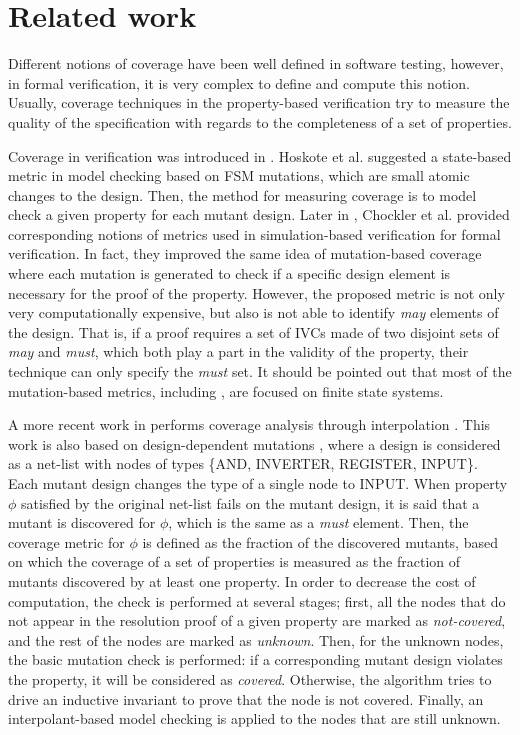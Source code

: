 \section{Related work}
\label{sec:related}

Different notions of coverage have been well defined in software testing, however, in formal verification, it is very complex to define and compute this notion.
Usually, coverage techniques in the property-based verification try to measure the quality of the specification with regards to the completeness of a set of properties.

Coverage in verification was introduced in \cite{hoskote1999coverage, katz1999have}. Hoskote et al. \cite{hoskote1999coverage} suggested a state-based metric in model checking based on FSM mutations, which are small atomic changes to the design. Then, the method for measuring coverage is to model check a given property for each mutant design.
Later in \cite{chockler_coverage_2003}, Chockler et al. provided corresponding notions of metrics used in simulation-based verification for formal verification. In fact, they improved the same idea of mutation-based coverage where each mutation is generated to check if a specific
design element is necessary for the proof of the property.
 However, the proposed metric is not only very computationally expensive, but also is not able to identify \emph{may} elements of the design. That is, if a proof requires a set of IVCs made of two disjoint sets of \emph{may} and \emph{must}, which both play a part in the validity of the property, their technique can only specify the \emph{must} set. It should be pointed out that most of the mutation-based metrics, including \cite{kupferman_theory_2008, chockler2001practical}, are focused on finite state systems.

A more recent work in \cite{chockler2010coverage} performs coverage analysis through interpolation \cite{mcmillan2003interpolation}. This work is also based on design-dependent mutations \cite{chockler_coverage_2003}, where a design is considered as a net-list with nodes of types \{AND, INVERTER, REGISTER, INPUT\}. Each mutant design changes the type of a single node to INPUT. When property $\phi$ satisfied by the original net-list fails on the mutant design, it is said that a mutant is discovered for $\phi$, which is the same as a \emph{must} element.
Then, the coverage metric for $\phi$ is defined as the fraction of the discovered mutants, based on which the coverage of a set of properties is measured as the fraction of mutants discovered by at least one property.
In order to decrease the cost of computation, the check is performed at several stages; first, all the nodes that do not appear in the resolution proof of a given property are marked as \emph{not-covered}, and the rest of the nodes are marked as \emph{unknown}. Then, for the unknown nodes, the basic mutation check is performed: if a corresponding mutant design violates the property, it will be considered as \emph{covered}. Otherwise, the algorithm tries to drive an inductive invariant to prove that the node is not covered. Finally, an interpolant-based model checking is applied to the nodes that are still unknown.

